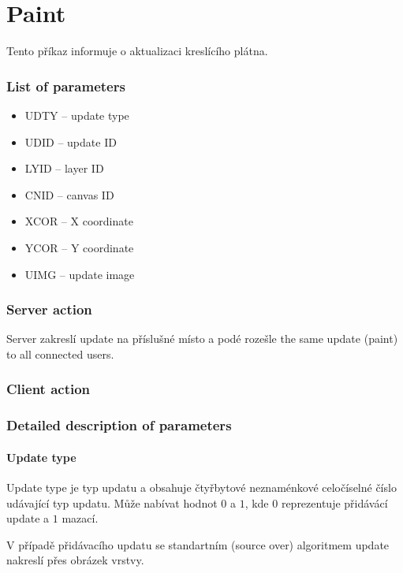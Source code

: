 \chapter{Paint}

Tento příkaz informuje o aktualizaci kreslícího plátna. 

\subsection{List of parameters}

\begin{itemize}
	\item UDTY -- update type
	\item UDID -- update ID
	\item LYID -- layer ID
	\item CNID -- canvas ID
	\item XCOR -- X coordinate
	\item YCOR -- Y coordinate
	\item UIMG -- update image				
\end{itemize}

\subsection{Server action}

Server zakreslí update na příslušné místo a podé rozešle the same update (paint) to all connected users.

\subsection{Client action}

\subsection{Detailed description of parameters}

\subsubsection{Update type}

Update type je typ updatu a obsahuje čtyřbytové neznaménkové celočíselné číslo udávající typ updatu. Může nabívat hodnot $0$ a $1$, kde $0$ reprezentuje přidávácí update a $1$ mazací.

V případě přidávacího updatu se standartním (source over) algoritmem update nakreslí přes obrázek vrstvy. 

